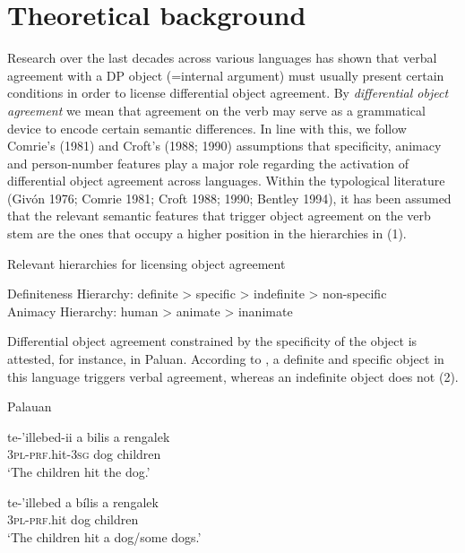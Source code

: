 \documentclass[output=paper]{langsci/langscibook}
\begin{document}
\section{Theoretical background}

Research over the last decades across various languages has shown that verbal agreement with a DP object (=internal argument) must usually present certain conditions in order to license differential object agreement. By \textit{differential object agreement} we mean that agreement on the verb may serve as a grammatical device to encode certain semantic differences. In line with this, we follow Comrie’s (1981) and Croft’s (1988; 1990) assumptions that specificity, animacy and person-number features play a major role regarding the activation of differential object agreement across languages. Within the typological literature (Givón 1976; Comrie 1981; Croft 1988; 1990; Bentley 1994), it has been assumed that the relevant semantic features that trigger object agreement on the verb stem are the ones that occupy a higher position in the hierarchies in (1).

{Relevant hierarchies for licensing object agreement}

\ea
\ea
  \textup{Definiteness Hierarchy: definite {\textgreater} specific {\textgreater} indefinite {\textgreater} non-specific}\\
\ex 
\textup{Animacy Hierarchy: human {\textgreater} animate {\textgreater} inanimate}\\
\z
\z

Differential object agreement constrained by the specificity of the object is attested, for instance, in Paluan. According to \citet[218]{Woolford2000}, a definite and specific object in this language triggers verbal agreement, whereas an indefinite object does not (2).

{Palauan {\citep[30]{Georgopoulos1991}}}

\ea
\gll te-’illebed-ii             a bilis          a rengalek\\
     \textsc{3pl-prf}.hit-\textsc{3sg}        dog              children\\
\glt ‘The children hit the dog.’
\z

\ea
\gll te-’illebed           a bílis         a rengalek\\
     \textsc{3}{\textsc{pl}}\textsc{{}-}{\textsc{prf}}.hit         dog             children\\
\glt ‘The children hit a dog/some dogs.’
\z
\end{document}
